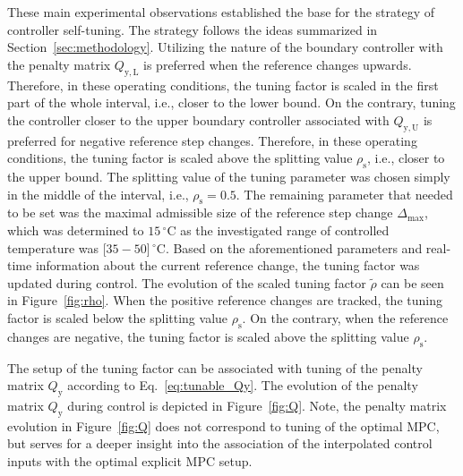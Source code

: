 \documentclass[preprint,12pt]{elsarticle}
\begin{document}
These main experimental observations established the base for the strategy of controller self-tuning. The strategy follows the ideas summarized in Section~\ref{sec:methodology}. Utilizing the nature of the boundary controller with the penalty matrix $Q_\mathrm{y, L}$ is preferred when the reference changes upwards. Therefore, in these operating conditions, the tuning factor is scaled in the first part of the whole interval, i.e., closer to the lower bound. On the contrary, tuning the controller closer to the upper boundary controller associated with $Q_\mathrm{y, U}$ is preferred for negative reference step changes. Therefore, in these operating conditions, the tuning factor is scaled above the splitting value $\rho_{\mathrm{s}}$, i.e., closer to the upper bound. The splitting value of the tuning parameter was chosen simply in the middle of the interval, i.e., $\rho_{\mathrm{s}} = 0.5$. The remaining parameter that needed to be set was the maximal admissible size of the reference step change $\Delta_{\max}$, which was determined to $15\,^{\circ}\mathrm{C}$ as the investigated range of controlled temperature was [$35-50$]\,$^{\circ}\mathrm{C}$. Based on the aforementioned parameters and real-time information about the current reference change, the tuning factor was updated during control. The evolution of the scaled tuning factor $\widetilde{\rho}$ can be seen in Figure~\ref{fig:rho}. When the positive reference changes are tracked, the tuning factor is scaled below the splitting value $\rho_{\mathrm{s}}$. On the contrary, when the reference changes are negative, the tuning factor is scaled above the splitting value $\rho_{\mathrm{s}}$.

The setup of the tuning factor can be associated with tuning of the penalty matrix $Q_{\mathrm{y}}$ according to Eq.~\eqref{eq:tunable_Qy}. The evolution of the penalty matrix $Q_{\mathrm{y}}$ during control is depicted in Figure~\ref{fig:Q}. Note, the penalty matrix evolution in Figure~\ref{fig:Q} does not correspond to tuning of the optimal MPC, but serves for a deeper insight into the association of the interpolated control inputs with the optimal explicit MPC setup.   
\end{document}
